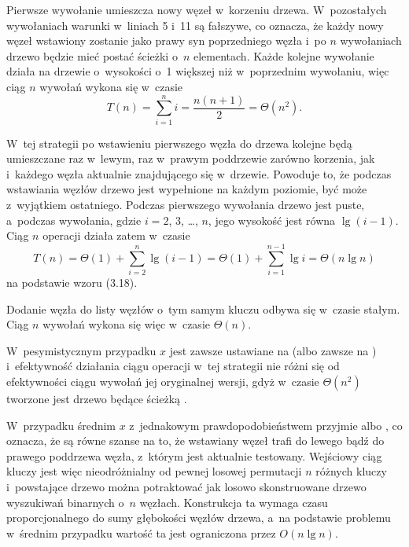 \exercise %

\problems


\subproblem %
Pierwsze wywołanie  umieszcza nowy węzeł w~korzeniu drzewa.
W~pozostałych wywołaniach warunki w~liniach 5 i~11 są fałszywe, co oznacza, że każdy nowy węzeł wstawiony zostanie jako prawy syn poprzedniego węzła i~po $n$ wywołaniach  drzewo będzie mieć postać ścieżki o~$n$ elementach.
Każde kolejne wywołanie działa na drzewie o~wysokości o~1 większej niż w~poprzednim wywołaniu, więc ciąg $n$ wywołań wykona się w~czasie
\[
	T(n) = \sum_{i=1}^ni = \frac{n(n+1)}{2} = \Theta(n^2).
\]

\subproblem %
W~tej strategii po wstawieniu pierwszego węzła do drzewa kolejne będą umieszczane raz w~lewym, raz w~prawym poddrzewie zarówno korzenia, jak i~każdego węzła aktualnie znajdującego się w~drzewie.
Powoduje to, że podczas wstawiania węzłów drzewo jest wypełnione na każdym poziomie, być może z~wyjątkiem ostatniego.
Podczas pierwszego wywołania  drzewo jest puste, a~podczas  wywołania, gdzie $i=2$, 3, \dots, $n$, jego wysokość jest równa $\lg(i-1)$.
Ciąg $n$ operacji  działa zatem w~czasie
\[
	T(n) = \Theta(1)+\sum_{i=2}^n\lg(i-1) = \Theta(1)+\sum_{i=1}^{n-1}\lg i = \Theta(n\lg n)
\]
na podstawie wzoru (3.18).

\subproblem %
Dodanie węzła do listy węzłów o~tym samym kluczu odbywa się w~czasie stałym.
Ciąg $n$ wywołań  wykona się więc w~czasie $\Theta(n)$.

\subproblem %
W~pesymistycznym przypadku $x$ jest zawsze ustawiane na  (albo zawsze na ) i~efektywność działania ciągu operacji  w~tej strategii nie różni się od efektywności ciągu wywołań jej oryginalnej wersji, gdyż w~czasie $\Theta(n^2)$ tworzone jest drzewo będące ścieżką .

W~przypadku średnim $x$ z~jednakowym prawdopodobieństwem przyjmie  albo , co oznacza, że są równe szanse na to, że wstawiany węzeł trafi do lewego bądź do prawego poddrzewa węzła, z~którym jest aktualnie testowany.
Wejściowy ciąg kluczy jest więc nieodróżnialny od pewnej losowej permutacji $n$ różnych kluczy i~powstające drzewo można potraktować jak losowo skonstruowane drzewo wyszukiwań binarnych o~$n$ węzłach.
Konstrukcja ta wymaga czasu proporcjonalnego do sumy głębokości węzłów drzewa, a~na podstawie problemu  w~średnim przypadku wartość ta jest ograniczona przez $O(n\lg n)$.

